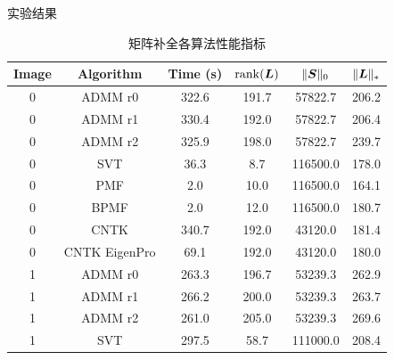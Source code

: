 \documentclass{beamer}
\begin{document}
\begin{frame}{实验结果}
  \begin{table}[H]
    \centering
    \small
    \caption{矩阵补全各算法性能指标}
    \label{tab:mc_index}
    \begin{tabular}{cccccc}
      \toprule
      Image & Algorithm     & Time (s)  & $\operatorname{rank}(\bm{L})$ & $\|\bm{S}\|_0$  & $\|\bm{L}\|_{*}$ \\
      \midrule
      0     & ADMM r0       & 322.6    & 191.7       & 57822.7     & 206.2         \\
      0     & ADMM r1       & 330.4    & 192.0       & 57822.7     & 206.4         \\
      0     & ADMM r2       & 325.9    & 198.0       & 57822.7     & 239.7         \\
      0     & SVT           & 36.3     & 8.7         & 116500.0    & 178.0         \\
      0     & PMF           & 2.0      & 10.0        & 116500.0    & 164.1         \\
      0     & BPMF          & 2.0      & 12.0        & 116500.0    & 180.7         \\
      0     & CNTK          & 340.7    & 192.0       & 43120.0     & 181.4         \\
      0     & CNTK EigenPro & 69.1     & 192.0       & 43120.0     & 180.0         \\
      1     & ADMM r0       & 263.3    & 196.7       & 53239.3     & 262.9         \\
      1     & ADMM r1       & 266.2    & 200.0       & 53239.3     & 263.7         \\
      1     & ADMM r2       & 261.0    & 205.0       & 53239.3     & 269.6         \\
      1     & SVT           & 297.5    & 58.7        & 111000.0    & 208.4         \\
      \bottomrule
    \end{tabular}
  \end{table}
\end{frame}
\end{document}
